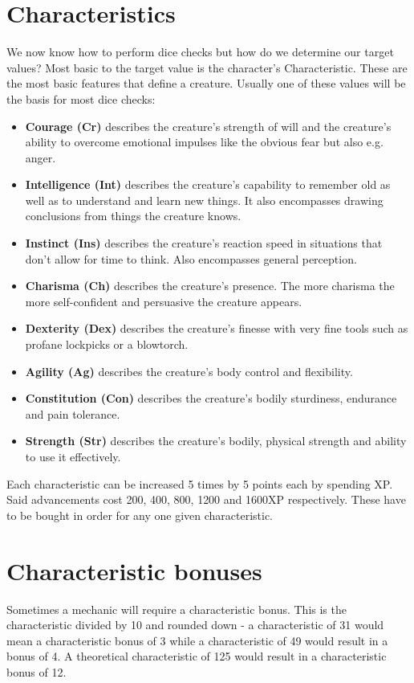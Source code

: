 \documentclass[12pt,a4paper,openany]{book}
\begin{document}
	\section{Characteristics}
	We now know how to perform dice checks but how do we determine our target values? Most basic to the target value is the character’s Characteristic. These are the most basic features that define a creature. Usually one of these values will be the basis for most dice checks:
	\begin{itemize}
		\setlength\itemsep{-8mm}
		\item \textbf{Courage (Cr)} describes the creature’s strength of will and the creature’s ability to overcome emotional impulses like the obvious fear but also e.g. anger.
		\item \textbf{Intelligence (Int)} describes the creature’s capability to remember old as well as to understand and learn new things. It also encompasses drawing conclusions from things the creature knows.
		\item \textbf{Instinct (Ins)} describes the creature’s reaction speed in situations that don’t allow for time to think. Also encompasses general perception.
		\item \textbf{Charisma (Ch)} describes the creature’s presence. The more charisma the more self-confident and persuasive the creature appears.
		\item \textbf{Dexterity (Dex)} describes the creature’s finesse with very fine tools such as profane lockpicks or a blowtorch.
		\item \textbf{Agility (Ag)} describes the creature’s body control and flexibility. 
		\item \textbf{Constitution (Con)} describes the creature’s bodily sturdiness, endurance and pain tolerance.
		\item \textbf{Strength (Str)} describes the creature’s bodily, physical strength and ability to use it effectively.
	\end{itemize}
	Each characteristic can be increased 5 times by 5 points each by spending XP. Said advancements cost 200, 400, 800, 1200 and 1600XP respectively. These have to be bought in order for any one given characteristic.
	\section{Characteristic bonuses}
	Sometimes a mechanic will require a characteristic bonus. This is the characteristic divided by 10 and rounded down - a characteristic of 31 would mean a characteristic bonus of 3 while a characteristic of 49 would result in a bonus of 4. A theoretical characteristic of 125 would result in a characteristic bonus of 12.
\end{document}

